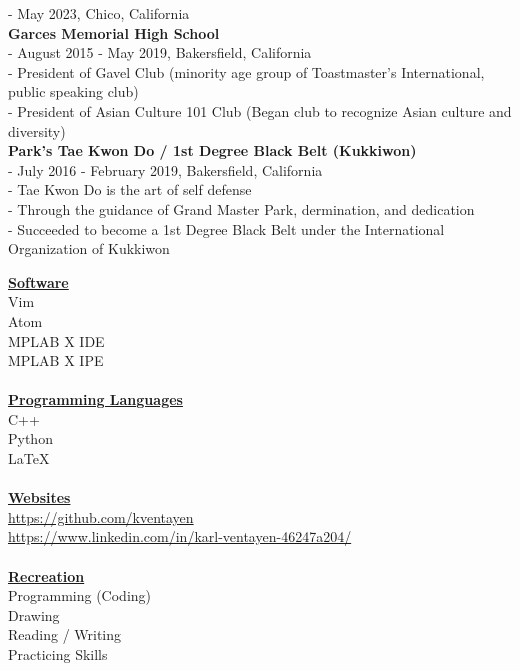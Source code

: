 \documentclass[10pt, letterpaper]{article}                %
\begin{document}
\tab \tab - May 2023, Chico, California\\
\textbf{Garces Memorial High School}\\
\tab \tab - August 2015 - May 2019, Bakersfield, California\\
\tab \tab - President of Gavel Club (minority age group of Toastmaster's International, public speaking club)\\
\tab \tab - President of Asian Culture 101 Club (Began club to recognize Asian culture and diversity)\\
\textbf{Park's Tae Kwon Do / 1st Degree Black Belt (Kukkiwon)}\\
\tab \tab - July 2016 - February 2019, Bakersfield, California\\
\tab \tab - Tae Kwon Do is the art of self defense\\
\tab \tab - Through the guidance of Grand Master Park, dermination, and dedication\\
\tab \tab - Succeeded to become a 1st Degree Black Belt under the International Organization of Kukkiwon
\begin{multicols}{2}
\noindent\textbf{\large \underline{Software}}\\
\tab \tab Vim\\
\tab \tab Atom\\
\tab \tab MPLAB X IDE\\
\tab \tab MPLAB X IPE\\
\\
\textbf{\large \underline{Programming Languages}}\\
\tab \tab C++\\
\tab \tab Python\\
\tab \tab LaTeX\\
\columnbreak
\\
\textbf{\large \underline{Websites}}\\
\tab \tab \url{https://github.com/kventayen}\\
\tab \tab \url{https://www.linkedin.com/in/karl-ventayen-46247a204/}\\
\\
\textbf{\large \underline{Recreation}}\\
\tab \tab Programming (Coding)\\
\tab \tab Drawing\\
\tab \tab Reading / Writing\\
\tab \tab Practicing Skills
\end{multicols}
\end{document}
